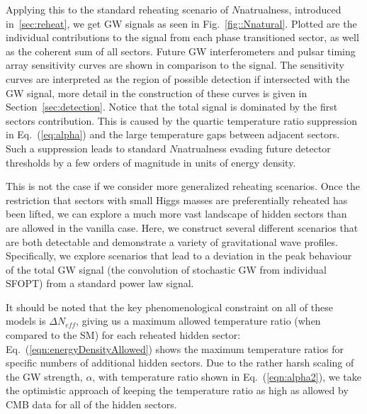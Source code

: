 \documentclass[nofootinbib,twocolumn,preprintnumbers]{revtex4-1}
\begin{document}
Applying this to the standard reheating scenario of $N$natrualness, introduced in~\ref{sec:reheat}, we get GW signals as seen in Fig.~\ref{fig::Nnatural}. Plotted are the individual contributions to the signal from each phase transitioned sector, as well as the coherent sum of all sectors. Future GW interferometers and pulsar timing array sensitivity curves are shown in comparison to the signal. The sensitivity curves are interpreted as the region of possible detection if intersected with the GW signal, more detail in the construction of these curves is given in Section~\ref{sec:detection}. Notice that the total signal is dominated by the first sectors contribution. This is caused by the quartic temperature ratio suppression in Eq.~(\ref{eq:alpha}) and the large temperature gaps between adjacent sectors. Such a suppression leads to standard $N$natrualness evading future detector thresholds by a few orders of magnitude in units of energy density. 

This is not the case if we consider more generalized reheating scenarios. Once the restriction that sectors with small Higgs masses are preferentially reheated has been lifted, we can explore a much more vast landscape of hidden sectors than are allowed in the vanilla case. Here, we construct several different scenarios that are both detectable and demonstrate a variety of gravitational wave profiles. Specifically, we explore scenarios that lead to a deviation in the peak behaviour of the total GW signal (the convolution of stochastic GW from individual SFOPT) from a standard power law signal.

It should be noted that the key phenomenological constraint on all of these models is $\Delta N_{eff}$, giving us a maximum allowed temperature ratio (when compared to the SM) for each reheated hidden sector: Eq.~(\ref{eqn:energyDensityAllowed}) shows the maximum temperature ratios for specific numbers of additional hidden sectors. Due to the rather harsh scaling of the GW strength, $\alpha$, with temperature ratio shown in Eq.~(\ref{eqn:alpha2}), we take the optimistic approach of keeping the temperature ratio as high as allowed by CMB data for all of the hidden sectors.
\end{document}
